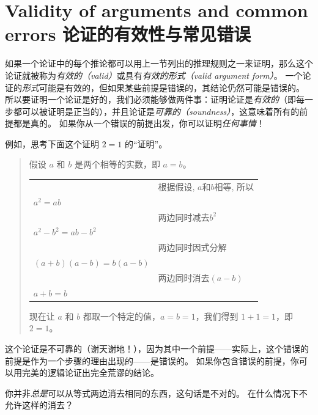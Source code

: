 \newpage




\newpage

\section{Validity of arguments and common errors 论证的有效性与常见错误}
\label{sec:valid}

如果一个论证中的每个推论都可以用上一节列出的推理规则之一来证明，那么这个论证就被称为\emph{有效的（valid）}或具有\emph{有效的形式（valid argument form）}。
一个论证的\emph{形式}可能是有效的，但如果某些前提是错误的，其结论仍然可能是错误的。
所以要证明一个论证是好的，我们必须能够做两件事：证明论证是\emph{有效的}（即每一步都可以被证明是正当的），并且论证是\emph{可靠的（soundness）}，这意味着所有的前提都是真的。
如果你从一个错误的前提出发，你可以证明\emph{任何事情}！

例如，思考下面这个证明 $2=1$ 的“证明”。
\begin{quote}
  
  假设 $a$ 和 $b$ 是两个相等的实数，即 $a=b$。
  
\begin{center}
\begin{tabular}{p{2in}p{2in}}
 & 根据假设, $a$和$b$相等, 所以\\
 $a^2 = ab$ & \\
 & 两边同时减去$b^2$\\
 $a^2 - b^2 = ab - b^2$& \\
 & 两边同时因式分解\\
 $(a+b)(a-b) = b(a-b)$ & \\
 & 两边同时消去$(a-b)$\\
 $a+b = b$ & \\
\end{tabular}
\end{center}
\medskip

现在让 $a$ 和 $b$ 都取一个特定的值，$a=b=1$，我们得到 $1+1=1$，即 $2=1$。
\end{quote}

这个论证是不可靠的（谢天谢地！），因为其中一个前提——实际上，这个错误的前提是作为一个步骤的理由出现的——是错误的。
如果你包含错误的前提，你可以用完美的逻辑论证出完全荒谬的结论。

\begin{exer}
你并非\emph{总是}可以从等式两边消去相同的东西，这句话是不对的。
在什么情况下不允许这样的消去？
\end{exer}

